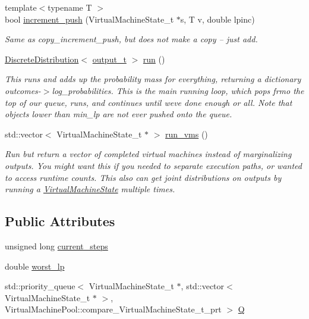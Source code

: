 \begin{DoxyCompactItemize}
{\footnotesize template$<$typename T $>$ }\\bool \hyperlink{class_virtual_machine_pool_ad02b07439ca58a4c7f867c5eaceb2e5f}{increment\+\_\+push} (Virtual\+Machine\+State\+\_\+t $\ast$s, T v, double lpinc)
\begin{DoxyCompactList}\small\item\em Same as copy\+\_\+increment\+\_\+push, but does not make a copy -- just add. \end{DoxyCompactList}\item 
\hyperlink{class_discrete_distribution}{Discrete\+Distribution}$<$ \hyperlink{class_virtual_machine_pool_a1e659e76790f4aa4ae074d82a8c381e1}{output\+\_\+t} $>$ \hyperlink{class_virtual_machine_pool_adf1e2a48d262a341627a92771f31cfcd}{run} ()
\begin{DoxyCompactList}\small\item\em This runs and adds up the probability mass for everything, returning a dictionary outcomes-\/$>$log\+\_\+probabilities. This is the main running loop, which pops frmo the top of our queue, runs, and continues until we\textquotesingle{}ve done enough or all. Note that objects lower than min\+\_\+lp are not ever pushed onto the queue. \end{DoxyCompactList}\item 
std\+::vector$<$ Virtual\+Machine\+State\+\_\+t $\ast$ $>$ \hyperlink{class_virtual_machine_pool_a82da0edd512bd5b112583d1ead3db151}{run\+\_\+vms} ()
\begin{DoxyCompactList}\small\item\em Run but return a vector of completed virtual machines instead of marginalizing outputs. You might want this if you needed to separate execution paths, or wanted to access runtime counts. This also can get joint distributions on outputs by running a \hyperlink{class_virtual_machine_state}{Virtual\+Machine\+State} multiple times. \end{DoxyCompactList}\end{DoxyCompactItemize}
\subsection*{Public Attributes}
\begin{DoxyCompactItemize}
\item 
unsigned long \hyperlink{class_virtual_machine_pool_aac7defa672fe880ecb6e47ba0c22e5d3}{current\+\_\+steps}
\item 
double \hyperlink{class_virtual_machine_pool_a758c6a2a065cb17a0255cb6ad9da3ece}{worst\+\_\+lp}
\item 
std\+::priority\+\_\+queue$<$ Virtual\+Machine\+State\+\_\+t $\ast$, std\+::vector$<$ Virtual\+Machine\+State\+\_\+t $\ast$ $>$, Virtual\+Machine\+Pool\+::compare\+\_\+\+Virtual\+Machine\+State\+\_\+t\+\_\+prt $>$ \hyperlink{class_virtual_machine_pool_a9c8823331ead214c736dacb390a672a8}{Q}
\end{DoxyCompactItemize}
